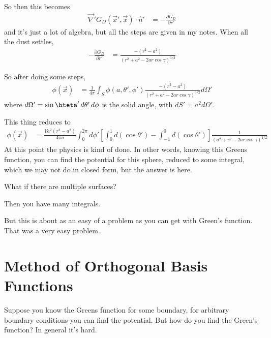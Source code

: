 So then this becomes
\begin{align}
    \vec{\nabla}' G_D \left( \vec{x}', \vec{x} \right)
    \cdot \hat{n}'
    &=
    - \frac{\partial G_D}{\partial r'}
\end{align}
and it's just a lot of algebra,
but all the steps are given in my notes.
When all the dust settles,
\begin{align}
    - \frac{\partial G_D}{\partial r'}
    &=
    \frac{-\left( r^2 - a^2 \right)}{
    \left( r^2 + a^2 - 2ar\cos\gamma \right)^{3/2}
    }
\end{align}

So after doing some steps,
\begin{align}
    \phi\left( \vec{x} \right)
    &=
    \frac{1}{4\pi}
    \int_S
    \phi\left( a, \theta', \phi' \right)
    \frac{-\left( r^2 - a^2 \right)}{
    \left( r^2 + a^2 - 2ar\cos\gamma \right)^{3/2}
    }
    d\Omega'
\end{align}
where $d\Omega' = \sin\hteta' \, d\theta'\, d\phi$
is the solid angle,
with $dS' = a^2 d\Omega'$.

This thing reduces to
\begin{align}
    \phi\left( \vec{x} \right)
    &=
    \frac{V a^2\left( r^2 - a^2 \right)}{4\pi a}
    \int_{0}^{2\pi}
    d\phi'
    \left[
    \int_{0}^{1}
    d\left( \cos\theta' \right)
    -
    \int_{-1}^{0}
    d\left( \cos\theta' \right)
    \right]
    \frac{1}{\left( a^2 + r^2 - 2ar\cos\gamma \right)^{1/2}}
\end{align}
At this point the physics is kind of done.
In other words,
knowing this Greens function,
you can find the potential for this sphere,
reduced to some integral,
which we may not do in closed form,
but the answer is here.

\begin{question}
    What if there are multiple surfaces?
\end{question}
Then you have many integrals.

But this is about as an easy of a problem as you can get with Green's function.
That was a very easy problem.

\section{Method of Orthogonal Basis Functions}
Suppose you know the Greens function for some boundary,
for arbitrary boundary conditions you can find the potential.
But how do you find the Green's function?
In general it's hard.

